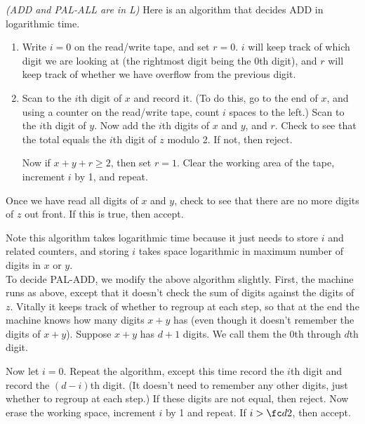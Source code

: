 \begin{problem}{\it(ADD and PAL-ALL are in L)}
Here is an algorithm that decides ADD in logarithmic time.
\begin{enumerate}
\item
Write $i=0$ on the read/write tape, and set $r=0$. $i$ will keep track of which digit we are looking at (the rightmost digit being the 0th digit), and $r$ will keep track of whether we have overflow from the previous digit.
\item
Scan to the $i$th digit of $x$ and record it. (To do this, go to the end of $x$, and using a counter on the read/write tape, count $i$ spaces to the left.) Scan to the $i$th digit of $y$. Now add the $i$th digits of $x$ and $y$, and $r$. Check to see that the total equals the $i$th digit of $z$ modulo 2. If not, then reject.

Now if $x+y+r\ge 2$, then set $r=1$. Clear the working area of the tape, increment $i$ by 1, and repeat.
\end{enumerate}
Once we have read all digits of $x$ and $y$, check to see that there are no more digits of $z$ out front. If this is true, then accept.

Note this algorithm takes logarithmic time because it just needs to store $i$ and related counters, and storing $i$ takes space logarithmic in maximum number of digits in $x$ or $y$.\\

To decide PAL-ADD, we modify the above algorithm slightly. First, the machine runs as above, except that it doesn't check the sum of digits against the digits of $z$. Vitally it keeps track of whether to regroup at each step, so that at the end the machine knows how many digits $x+y$ has (even though it doesn't remember the digits of $x+y$). Suppose $x+y$ has $d+1$ digits. We call them the $0$th through $d$th digit.

Now let $i=0$. Repeat the algorithm, except this time record the $i$th digit and record the $(d-i)$th digit. (It doesn't need to remember any other digits, just whether to regroup at each step.) If these digits are not equal, then reject. Now erase the working space, increment $i$ by 1 and repeat. If $i>\fc d2$, then accept. 
\end{problem}

\pagebreak

